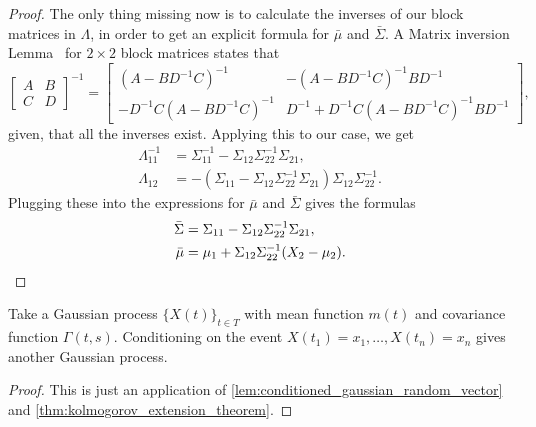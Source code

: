 \begin{proof}
    The only thing missing now is to calculate the inverses of our block matrices in $\Lambda$, in order to get an explicit formula for \( \bar{\mu} \) and \( \bar{\Sigma} \).
    A Matrix inversion Lemma~\cite{lu2002inverses} for $2 \times 2$ block matrices states that
    \[
    \begin{bmatrix} A & B \\ C & D \end{bmatrix}^{-1} = \begin{bmatrix} (A-BD^{-1}C)^{-1} & -(A-BD^{-1}C)^{-1}BD^{-1} \\ -D^{-1}C(A-BD^{-1}C)^{-1} & D^{-1}+D^{-1}C(A-BD^{-1}C)^{-1}BD^{-1} \end{bmatrix},
    \]
    given, that all the inverses exist.
    Applying this to our case, we get
    \begin{align*}
        \Lambda_{11}^{-1} &= \Sigma_{11}^{-1} - \Sigma_{12} \Sigma_{22}^{-1} \Sigma_{21},\\
        \Lambda_{12} &= -(\Sigma_{11}- \Sigma_{12} \Sigma_{22}^{-1} \Sigma_{21}) \Sigma_{12} \Sigma_{22}^{-1}.
    \end{align*}
    Plugging these into the expressions for $\bar{\mu}$ and $\bar{\Sigma}$ gives the formulas
    \begin{align*}
        \bar{\Sigma} &= \Sigma_{11} - \Sigma_{12} \Sigma_{22}^{-1} \Sigma_{21},\\
        \bar{\mu} &= \mu_{1} + \Sigma_{12} \Sigma_{22}^{-1}(X_{2}-\mu_{2}). \qedhere
    \end{align*}
\end{proof}





\begin{proposition}
    Take a Gaussian process \( \{X(t)\}_{t \in T} \) with mean function \( m(t) \) and covariance function \( \Gamma(t,s) \). Conditioning on the event \( X(t_{1}) = x_{1}, \dots, X(t_{n}) = x_{n} \) gives another Gaussian process.
\end{proposition}
\begin{proof}
    This is just an application of \cref{lem:conditioned_gaussian_random_vector} and \cref{thm:kolmogorov_extension_theorem}. \qedhere
\end{proof}





 


